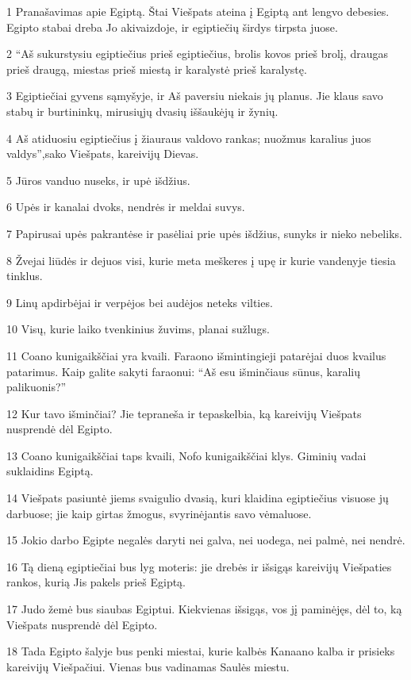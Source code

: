 \par 1 Pranašavimas apie Egiptą. Štai Viešpats ateina į Egiptą ant lengvo debesies. Egipto stabai dreba Jo akivaizdoje, ir egiptiečių širdys tirpsta juose. 
\par 2 “Aš sukurstysiu egiptiečius prieš egiptiečius, brolis kovos prieš brolį, draugas prieš draugą, miestas prieš miestą ir karalystė prieš karalystę. 
\par 3 Egiptiečiai gyvens sąmyšyje, ir Aš paversiu niekais jų planus. Jie klaus savo stabų ir burtininkų, mirusiųjų dvasių iššaukėjų ir žynių. 
\par 4 Aš atiduosiu egiptiečius į žiauraus valdovo rankas; nuožmus karalius juos valdys”,­sako Viešpats, kareivijų Dievas. 
\par 5 Jūros vanduo nuseks, ir upė išdžius. 
\par 6 Upės ir kanalai dvoks, nendrės ir meldai suvys. 
\par 7 Papirusai upės pakrantėse ir pasėliai prie upės išdžius, sunyks ir nieko nebeliks. 
\par 8 Žvejai liūdės ir dejuos visi, kurie meta meškeres į upę ir kurie vandenyje tiesia tinklus. 
\par 9 Linų apdirbėjai ir verpėjos bei audėjos neteks vilties. 
\par 10 Visų, kurie laiko tvenkinius žuvims, planai sužlugs. 
\par 11 Coano kunigaikščiai yra kvaili. Faraono išmintingieji patarėjai duos kvailus patarimus. Kaip galite sakyti faraonui: “Aš esu išminčiaus sūnus, karalių palikuonis?” 
\par 12 Kur tavo išminčiai? Jie tepraneša ir tepaskelbia, ką kareivijų Viešpats nusprendė dėl Egipto. 
\par 13 Coano kunigaikščiai taps kvaili, Nofo kunigaikščiai klys. Giminių vadai suklaidins Egiptą. 
\par 14 Viešpats pasiuntė jiems svaigulio dvasią, kuri klaidina egiptiečius visuose jų darbuose; jie kaip girtas žmogus, svyrinėjantis savo vėmaluose. 
\par 15 Jokio darbo Egipte negalės daryti nei galva, nei uodega, nei palmė, nei nendrė. 
\par 16 Tą dieną egiptiečiai bus lyg moteris: jie drebės ir išsigąs kareivijų Viešpaties rankos, kurią Jis pakels prieš Egiptą. 
\par 17 Judo žemė bus siaubas Egiptui. Kiekvienas išsigąs, vos jį paminėjęs, dėl to, ką Viešpats nusprendė dėl Egipto. 
\par 18 Tada Egipto šalyje bus penki miestai, kurie kalbės Kanaano kalba ir prisieks kareivijų Viešpačiui. Vienas bus vadinamas Saulės miestu. 
